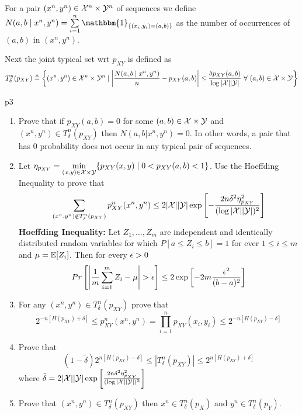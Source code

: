 \documentclass[a4paper, 11pt]{article}
\begin{document}
For a pair $(x^n,y^n)\in \mathcal{X}^n\times \mathcal{Y}^n$ of sequences we define $N(a,b\mid x^n,y^n)=\sum\limits_{i=1}^n\mathbbm{1}_{\{(x_i,y_i)=(a,b)\}}$ as the number of occurrences of $(a,b)$ in $(x^n,y^n)$. 

Next the joint typical set wrt $p_{XY}$ is defined as $$T_{\delta}^n(p_{XY})\triangleq \left\{ (x^n,y^n)\in \mathcal{X}^n\times \mathcal{Y}^n\mid \left|\frac{N(a,b\mid x^n,y^n)}{n}-p_{XY}(a,b)  \right| \leq \frac{\delta p_{XY}(a,b)}{\log |\mathcal{X}||\mathcal{Y}|}\ \forall \ (a,b)\in \mathcal{X}\times \mathcal{Y}\right\}$$
 
\begin{problem}{%
}{p3%
}

\begin{enumerate}
	\item Prove that if $p_{XY}(a,b)=0$ for some $(a,b)\in \mathcal{X}\times \mathcal{Y}$ and $(x^n,y^n)\in T_{\delta}^n(p_{XY})$ then $N(a,b|x^n,y^n)=0$. In other words, a pair that has 0 probability does not occur in any typical pair of sequences.
	\item Let $\eta_{p_{XY}}=\min\limits_{(x,y)\in \mathcal{X}\times \mathcal{Y}}\{p_{XY}(x,y)\mid 0<p_{XY}(a,b)<1\}$. Use the Hoeffding Inequality to prove that $$\sum_{(x^n,y^n)\notin T_{\delta}^n(p_{XY})}p_{XY}^n(x^n,y^n)\leq 2|\mathcal{X}||\mathcal{Y}|\exp\left[- \frac{2n\delta^2\eta^2_{p_{XY}}}{(\log |\mathcal{X}||\mathcal{Y}|)^2}  \right]$$
	\textbf{Hoeffding Inequality:} Let $Z_1,\dots, Z_m$ are independent and identically distributed random variables for which $P[a\leq Z_i\leq b]=1$ for ever $1\leq i\leq m$ and $\mu=\mathbb{E}[Z_i]$. Then for every $\epsilon>0$ $$Pr\lt[\lt| \frac1m\sum_{i=1}^mZ_i-\mu \rt|>\eps\rt]\leq 2\exp\lt[ -2m\frac{\eps^2}{(b-a)^2}\rt ]$$
	\item For any $(x^n,y^n)\in T_{\delta}^n(p_{XY})$ prove that $$2^{-n[H(p_{XY})+\delta]}\leq p_{XY}^n(x^n,y^n)=\prod_{i=1}^np_{XY}(x_i,y_i)\leq 2^{-n[H(p_{XY})-\delta]}$$
	\item Prove that $$(1-\tilde{\delta})2^{n[H(p_{XY})-\delta]}\leq |T_{\delta}^n(p_{XY})|\leq 2^{n[H(p_{XY})+\delta]}$$ where $\tilde{\delta}=2|\mathcal{X}||\mathcal{Y}|\exp\left[  \frac{2n\delta^2\eta^2_{p_{XY}}}{(\log |\mathcal{X}||\mathcal{Y}|)^2}   \right]$
	\item Prove that $(x^n,y^n)\in T_{\delta}^n(p_{XY})$ then $x^n\in T_{\delta}^n (p_X)$ and $y^n\in T_{\delta}^n(p_Y)$.
\end{enumerate}
\end{problem}
\end{document}
